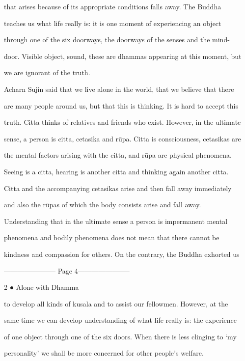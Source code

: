 that   arises   because   of   its   appropriate   conditions   falls   away.   The   Buddha  

teaches   us  what   life  really  is:  it  is  one  moment  of  experiencing  an  object  

through  one  of the  six  doorways, the  doorways  of the  senses  and the  mind- 

door. Visible object, sound, these are dhammas appearing at this moment, but  

we are ignorant of the truth. 



Acharn  Sujin  said that we live  alone in the world, that we believe that there  

are many people around us, but that this is thinking. It is hard to accept this  

truth. Citta thinks of relatives and friends who exist. However, in the ultimate  

sense, a person is citta, cetasika and rūpa. Citta is consciousness, cetasikas are  

the  mental  factors  arising with  the  citta,  and  rūpa  are  physical  phenomena.  

Seeing  is  a  citta,  hearing  is  another  citta  and  thinking  again  another  citta.  

Citta  and  the  accompanying  cetasikas  arise  and  then  fall  away  immediately  

and also the rūpas of which the body consists arise and fall away. 

   Understanding that  in the ultimate  sense  a person  is  impermanent mental  

phenomena   and   bodily   phenomena   does   not   mean   that   there   cannot   be  

kindness and compassion for others. On the contrary, the Buddha exhorted us  


----------------------- Page 4-----------------------

2 ● Alone with Dhamma 



to  develop  all kinds  of kusala  and  to  assist  our  fellowmen.  However,  at  the  

same time we can develop understanding of what life really is: the experience  

of one object through one of the six doors. When there is less clinging to ‘my  

personality’ we shall be more concerned for other people’s welfare. 

